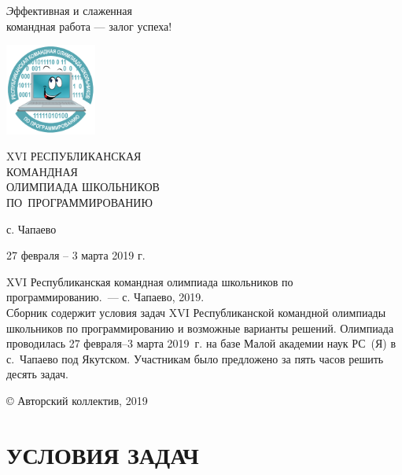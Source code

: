\documentclass[a5paper, twoside, 11pt]{article}
\begin{document}
\pagestyle{empty}
\begin{flushright}
\textit
Эффективная и слаженная\\
командная работа --- залог успеха!
\end{flushright}
{}\vskip-18mm

\includegraphics[width=3cm, height=3cm]{../logo.pdf}
\\[3cm]

\begin{center}
\huge
XVI РЕСПУБЛИКАНСКАЯ \\КОМАНДНАЯ\\ОЛИМПИАДА ШКОЛЬНИКОВ \\
ПО~ПРОГРАММИРОВАНИЮ
\end{center}

\vfill
\centerline{с. Чапаево}
\centerline{27 февраля -- 3 марта 2019 г.}

\newpage

\noindent XVI Республиканская командная олимпиада школьников по программированию.~--- с. Чапаево, 2019.
\\[5mm]
Сборник содержит условия задач XVI Республиканской командной олимпиады школьников по программированию и возможные варианты решений. Олимпиада проводилась 27 февраля--3 марта 2019~г. на базе Малой академии наук РС~(Я) в с.~Чапаево под Якутском. Участникам было предложено за пять часов решить десять задач.
\vfill

{}\hfill © Авторский коллектив, 2019

\newpage



\newpage

\noindent
\pagestyle{fancy}



\newpage
\rm
\thispagestyle{plain}
\section*{УСЛОВИЯ ЗАДАЧ} 

\end{document}
